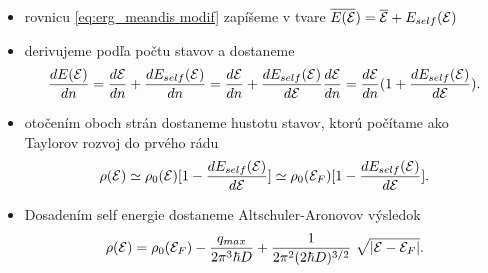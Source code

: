 \documentclass[
	11pt, %
]{beamer}
\begin{document}
\begin{frame}

\begin{itemize}
\item rovnicu \eqref{eq:erg_meandis modif}  zapíšeme v tvare  $\overline{E(\mathcal{E}})=\overline{\mathcal{E}}+E_{self}(\mathcal{E})$
\item derivujeme podľa počtu stavov a dostaneme 
\begin{equation}
\label{eq:der}
  \frac{d E(\mathcal{E})}{dn}=\frac{d\mathcal{E}}{dn}+\frac{dE_{self}(\mathcal{E})}{dn}=\frac{d\mathcal{E}}{dn}+\frac{dE_{self}(\mathcal{E})}{d\mathcal{E}}\frac{d\mathcal{E}}{dn}=\frac{d\mathcal{E}}{dn}(1+\frac{dE_{self}(\mathcal{E})}{d\mathcal{E}}) \text{.}
\end{equation}
\item otočením oboch strán dostaneme hustotu stavov, ktorú počítame ako Taylorov rozvoj do prvého rádu
\begin{equation}
 \label{eq:aa_dos2}
 \rho(\mathcal{E}) \simeq \rho_0(\mathcal{E})[1-\frac{dE_{self}(\mathcal{E})}{d\mathcal{E}}] \simeq \rho_0(\mathcal{E}_F)[1-\frac{dE_{self}(\mathcal{E})}{d\mathcal{E}}] \text{.}
\end{equation}
\item Dosadením self energie dostaneme Altschuler-Aronovov výsledok
\begin{equation}
 \label{eq:aa_dos3 fin}
 \rho(\E)=\rho_0(\E_F) - \frac{q_{max}}{2\pi^3 \hbar D}
 +    \frac{1}{2\pi^2 (2\hbar D)^{3/2}}  \ \sqrt{|\E-\E_F|}  \text{.}
\end{equation}
\end{itemize}
\end{frame}
\end{document}
